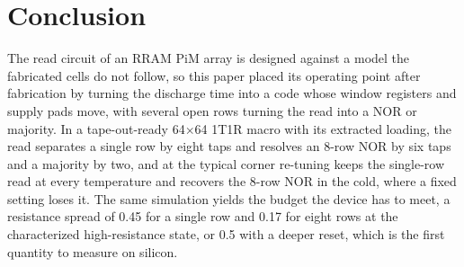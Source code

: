 \section{Conclusion}
\label{sec:concl}
The read circuit of an RRAM PiM array is designed against a model the fabricated cells do not follow, so this paper placed its operating point after fabrication by turning the discharge time into a code whose window registers and supply pads move, with several open rows turning the read into a NOR or majority.
In a tape-out-ready 64$\times$64 1T1R macro with its extracted loading, the read separates a single row by eight taps and resolves an 8-row NOR by six taps and a majority by two, and at the typical corner re-tuning keeps the single-row read at every temperature and recovers the 8-row NOR in the cold, where a fixed setting loses it.
The same simulation yields the budget the device has to meet, a resistance spread of 0.45 for a single row and 0.17 for eight rows at the characterized high-resistance state, or 0.5 with a deeper reset, which is the first quantity to measure on silicon.
